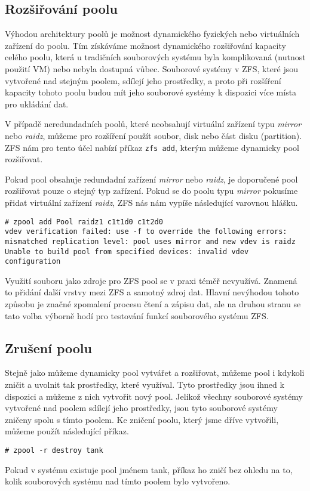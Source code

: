 \subsection{Rozšiřování poolu}
Výhodou architektury poolů je možnost dynamického fyzických nebo virtuálních zařízení do poolu. Tím získáváme možnost dynamického rozšiřování kapacity celého poolu, která u tradičních souborových systému byla komplikovaná (nutnost použití VM) nebo nebyla dostupná vůbec. Souborové systémy v ZFS, které jsou vytvořené nad stejným poolem, sdílejí jeho prostředky, a proto při rozšíření kapacity tohoto poolu budou mít jeho souborové systémy k dispozici více místa pro ukládání dat.

V případě neredundadních poolů, které neobsahují virtuální zařízení typu \emph{mirror} nebo \emph{raidz}, můžeme pro rozšíření použít soubor, disk nebo část disku (partition). ZFS nám pro tento účel nabízí příkaz \verb|zfs add|, kterým můžeme dynamicky pool rozšiřovat.

Pokud pool obsahuje redundadní zařízení \emph{mirror} nebo \emph{raidz}, je doporučené pool rozšiřovat pouze o stejný typ zařízení. Pokud se do poolu typu \emph{mirror} pokusíme přidat virtuální zařízení \emph{raidz}, ZFS nás nám vypíše následující varovnou hlášku.
\begin{verbatim}
# zpool add Pool raidz1 c1t1d0 c1t2d0
vdev verification failed: use -f to override the following errors:
mismatched replication level: pool uses mirror and new vdev is raidz
Unable to build pool from specified devices: invalid vdev configuration
\end{verbatim}

Využití souboru jako zdroje pro ZFS pool se v praxi téměř nevyužívá. Znamená to přidání další vrstvy mezi ZFS a samotný zdroj dat. Hlavní nevýhodou tohoto způsobu je značné zpomalení procesu čtení a zápisu dat, ale na druhou stranu se tato volba výborně hodí pro testování funkcí souborového systému ZFS.

\subsection{Zrušení poolu}
Stejně jako můžeme dynamicky pool vytvářet a rozšiřovat, můžeme pool i kdykoli zničit a uvolnit tak prostředky, které využíval. Tyto prostředky jsou ihned k dispozici a můžeme z nich vytvořit nový pool. Jelikož všechny souborové systémy vytvořené nad poolem sdílejí jeho prostředky, jsou tyto souborové systémy zničeny spolu s tímto poolem. Ke zničení poolu, který jsme dříve vytvořili, můžeme použít následující příkaz.
\begin{verbatim}
# zpool -r destroy tank
\end{verbatim}
Pokud v systému existuje pool jménem tank, příkaz ho zničí bez ohledu na to, kolik souborových systému nad tímto poolem bylo vytvořeno.

